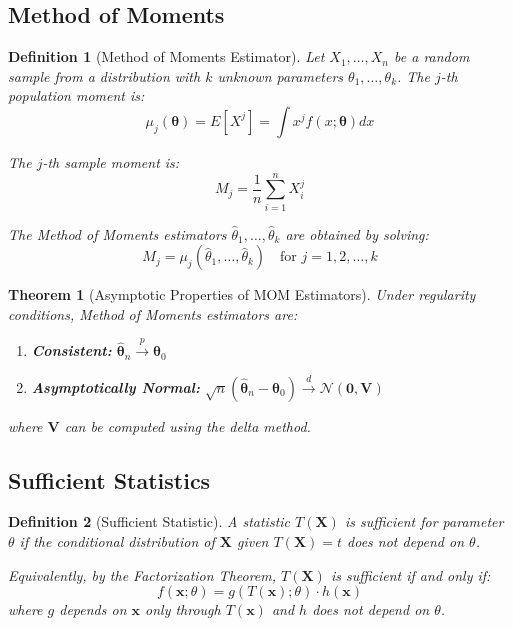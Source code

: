 \documentclass[12pt,a4paper]{article}
\newtheorem{theorem}{Theorem}[section]
\newtheorem{definition}{Definition}[section]
\theoremstyle{remark}
\begin{document}
\subsection{Method of Moments}

\begin{definition}[Method of Moments Estimator]
Let $X_1, \ldots, X_n$ be a random sample from a distribution with $k$ unknown parameters $\theta_1, \ldots, \theta_k$. The $j$-th population moment is:
$$\mu_j(\boldsymbol{\theta}) = E[X^j] = \int x^j f(x; \boldsymbol{\theta}) dx$$

The $j$-th sample moment is:
$$M_j = \frac{1}{n}\sum_{i=1}^n X_i^j$$

The Method of Moments estimators $\hat{\theta}_1, \ldots, \hat{\theta}_k$ are obtained by solving:
$$M_j = \mu_j(\hat{\theta}_1, \ldots, \hat{\theta}_k) \quad \text{for } j = 1, 2, \ldots, k$$
\end{definition}

\begin{theorem}[Asymptotic Properties of MOM Estimators]
Under regularity conditions, Method of Moments estimators are:
\begin{enumerate}
\item \textbf{Consistent:} $\hat{\boldsymbol{\theta}}_n \stackrel{p}{\to} \boldsymbol{\theta}_0$
\item \textbf{Asymptotically Normal:} $\sqrt{n}(\hat{\boldsymbol{\theta}}_n - \boldsymbol{\theta}_0) \stackrel{d}{\to} \mathcal{N}(\mathbf{0}, \mathbf{V})$
\end{enumerate}
where $\mathbf{V}$ can be computed using the delta method.
\end{theorem}

\subsection{Sufficient Statistics}

\begin{definition}[Sufficient Statistic]
A statistic $T(\mathbf{X})$ is sufficient for parameter $\theta$ if the conditional distribution of $\mathbf{X}$ given $T(\mathbf{X}) = t$ does not depend on $\theta$.

Equivalently, by the Factorization Theorem, $T(\mathbf{X})$ is sufficient if and only if:
$$f(\mathbf{x}; \theta) = g(T(\mathbf{x}); \theta) \cdot h(\mathbf{x})$$
where $g$ depends on $\mathbf{x}$ only through $T(\mathbf{x})$ and $h$ does not depend on $\theta$.
\end{definition}
\end{document}
